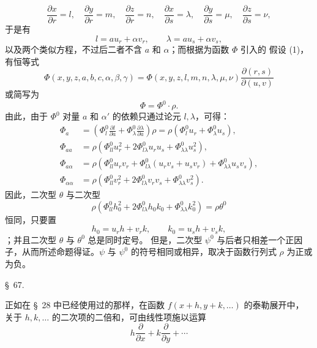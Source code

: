 \documentclass[11pt,a4paper,leqno]{article}
\begin{document}
\[
\frac{\partial x}{\partial r}=l,\quad
\frac{\partial y}{\partial r}=m,\quad
\frac{\partial z}{\partial r}=n,\quad
\frac{\partial x}{\partial s}=\lambda,\quad
\frac{\partial y}{\partial s}=\mu,\quad
\frac{\partial z}{\partial s}=\nu,
\]
于是有
\[
l=au_r+\alpha v_r,\qquad \lambda=au_s+\alpha v_s,
\]
以及两个类似方程，不过后二者不含 $a$ 和 $\alpha$；而根据为函数 $\Phi$ 引入的
假设 (1)，有恒等式
\[
\Phi(x,y,z,a,b,c,\alpha,\beta,\gamma)
=\Phi(x,y,z,l,m,n,\lambda,\mu,\nu)
\frac{\partial(r,s)}{\partial(u,v)}
\]
或简写为
\[
\Phi=\Phi^0\cdot\rho.
\]
由此，由于 $\Phi^0$ 对量 $a$ 和 $\alpha'$ 的依赖只通过论元 $l,\lambda$，可得：
\[
\begin{aligned}
\Phi_a
&=\left(\Phi_l^0\frac{\partial l}{\partial a}
+\Phi_\lambda^0\frac{\partial\lambda}{\partial a}\right)\rho
=\rho(\Phi_l^0u_r+\Phi_\lambda^0u_s),\\
\Phi_{aa}
&=\rho\left(\Phi_{ll}^0u_r^2+2\Phi_{l\lambda}^0u_ru_s
+\Phi_{\lambda\lambda}^0u_s^2\right),\\
\Phi_{a\alpha}
&=\rho\left(\Phi_{ll}^0u_rv_r
+\Phi_{l\lambda}^0(u_rv_s+u_sv_r)
+\Phi_{\lambda\lambda}^0u_sv_s\right),\\
\Phi_{\alpha\alpha}
&=\rho\left(\Phi_{ll}^0v_r^2+2\Phi_{l\lambda}^0v_rv_s
+\Phi_{\lambda\lambda}^0v_s^2\right).
\end{aligned}
\]
因此，二次型 $\theta$ 与二次型
\[
\rho\left(\Phi_{ll}^0h_0^2+2\Phi_{l\lambda}^0h_0k_0
+\Phi_{\lambda\lambda}^0k_0^2\right)=\rho\theta^0
\]
恒同，只要置
\[
h_0=u_rh+v_rk,\qquad k_0=u_sh+v_sk,
\]
；并且二次型 $\theta$ 与 $\theta^0$ 总是同时定号。
但是，二次型 $\psi^0$ 与后者只相差一个正因子，从而所述命题得证。$\psi$ 与
$\psi^0$ 的符号相同或相异，取决于函数行列式 $\rho$ 为正或为负。

\begin{center}
{\large \S~67.}
\end{center}

正如在 \S~28 中已经使用过的那样，在函数 $f(x+h,y+k,\ldots)$ 的泰勒展开中，
关于 $h,k,\ldots$ 的二次项的二倍和，可由线性项施以运算
\[
h\frac{\partial}{\partial x}+k\frac{\partial}{\partial y}+\cdots
\]
\end{document}
